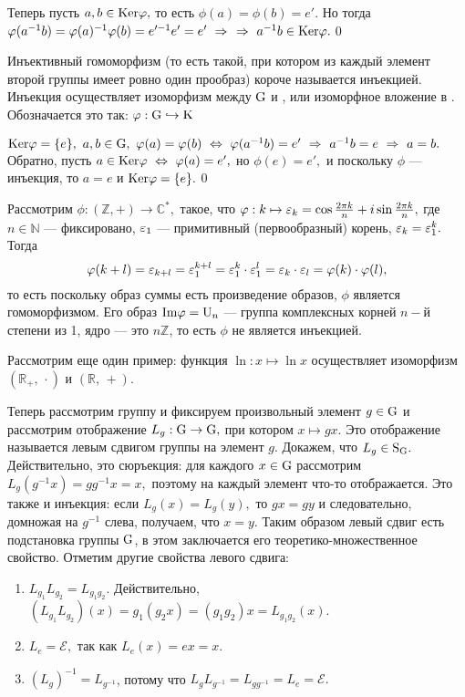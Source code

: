 Теперь пусть $a,b \in{\rm Ker}\varphi,$ то есть $\phi(a)=\phi(b)=e'.$ Но тогда $\varphi(a^{-1}b)=\varphi(a)^{-1}\varphi(b)=e'^{-1}e'=e'\ \Rightarrow\ \ \Rightarrow\  a^{-1}b\in{\rm Ker}\varphi.$\quad\qed
\par Инъективный гомоморфизм (то есть такой, при котором из каждый элемент второй группы имеет ровно один прообраз) короче называется инъекцией.
Инъекция осуществляет изоморфизм между ${\rm G}$ и , или изоморфное вложение  в . Обозначается это так: $\varphi : {\rm G}\hookrightarrow{\rm K}$
\par\dok $\rr{Ker}\phi=\{e\},\ a,b\in\rr{G},\ \phi(a)=\phi(b)\lra\phi(a^{-1}b)=e'\ra a^{-1}b=e\ra a=b.$\\ Обратно,
пусть $a\in{\rm Ker}\varphi\ \Leftrightarrow\  \varphi(a)=e',$ но $\phi(e)=e',$ и поскольку $\phi$ --- инъекция, то $a=e$ и ${\rm Ker}\varphi=\{e\}.$\quad\qed
\par Рассмотрим $\phi : (\mathbb{Z},+)\rightarrow\mathbb{C}^*,$ такое, что $\varphi : k\mapsto\varepsilon_k=\cos\frac{2\pi k}{n}+i\sin\frac{2\pi k}n,$ где
$n\in\mathbb{N}$ --- фиксировано, $\varepsilon_1$ --- примитивный (первообразный) корень, $\varepsilon_k=\varepsilon_1^k.$ Тогда
$$\varphi(k+l)=\varepsilon_{k+l}=\varepsilon_1^{k+l}=\varepsilon_1^k\cdot\varepsilon_1^l=\varepsilon_k\cdot\varepsilon_l=\varphi(k)\cdot\varphi(l),$$ то есть поскольку образ суммы есть
произведение образов, $\phi$ является гомоморфизмом. Его образ ${\rm Im}\varphi={\rm U}_n$ --- группа комплексных корней $n-$й степени из 1,
ядро --- это $n\mathbb{Z}$, то есть $\phi$ не является инъекцией.
\par Рассмотрим еще один пример: функция $\ln : x\mapsto\ln x$ осуществляет изоморфизм $(\mathbb{R}_+,\,\cdot)$ и $(\mathbb{R},\,+).$
\par Теперь рассмотрим группу  и фиксируем произвольный элемент $g\in{\rm G}$ и рассмотрим отображение $L_g : {\rm G}\rightarrow{\rm G},$
при котором $x\mapsto gx.$ Это отображение называется левым сдвигом группы на элемент $g$. Докажем, что $L_g\in {\rm S}_{\rm G}.$ Действительно,
это сюръекция: для каждого $x\in{\rm G}$ рассмотрим $L_g(g^{-1}x)=gg^{-1}x=x,$ поэтому на каждый элемент что-то отображается. Это также и инъекция:
если $L_g(x)=L_g(y),$ то $gx=gy$ и следовательно, домножая на $g^{-1}$ слева, получаем, что $x=y$.
Таким образом левый сдвиг есть подстановка группы ${\rm G}$, в этом заключается его теоретико-множественное свойство. Отметим другие свойства левого сдвига:
\begin{enumerate}
    \item $L_{g_1}L_{g_2}=L_{g_1g_2}.$ Действительно, $(L_{g_1}L_{g_2})(x)=g_1(g_2x)=(g_1g_2)x=L_{g_1g_2}(x).$
    \item $L_e=\mathcal{E},$ так как $L_e(x)=ex=x.$
    \item $(L_g)^{-1}=L_{g^{-1}}$, потому что $L_gL_{g^{-1}}=L_{gg^{-1}}=L_e=\mathcal{E}.$
\end{enumerate}
